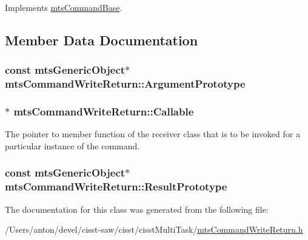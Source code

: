 Implements \hyperlink{classmts_command_base_a0885ce7a5321d7b672694ade780b9d64}{mts\+Command\+Base}.



\subsection{Member Data Documentation}
\hypertarget{classmts_command_write_return_a21b712fb9036e3dfad2d67c5f15932d2}{}
\subsubsection[{Argument\+Prototype}]{\setlength{\rightskip}{0pt plus 5cm}const {\bf mts\+Generic\+Object}$\ast$ mts\+Command\+Write\+Return\+::\+Argument\+Prototype\hspace{0.3cm}{\ttfamily [protected]}}\label{classmts_command_write_return_a21b712fb9036e3dfad2d67c5f15932d2}
\hypertarget{classmts_command_write_return_ada842b5e68290a2c53de66702025f4ab}{}
\subsubsection[{Callable}]{$\ast$ mts\+Command\+Write\+Return\+::\+Callable\hspace{0.3cm}{\ttfamily [protected]}}\label{classmts_command_write_return_ada842b5e68290a2c53de66702025f4ab}
The pointer to member function of the receiver class that is to be invoked for a particular instance of the command. \hypertarget{classmts_command_write_return_a02ec49cd66e7d95bd1ac9d08e5eb8cae}{}
\subsubsection[{Result\+Prototype}]{\setlength{\rightskip}{0pt plus 5cm}const {\bf mts\+Generic\+Object}$\ast$ mts\+Command\+Write\+Return\+::\+Result\+Prototype\hspace{0.3cm}{\ttfamily [protected]}}\label{classmts_command_write_return_a02ec49cd66e7d95bd1ac9d08e5eb8cae}


The documentation for this class was generated from the following file\+:\begin{DoxyCompactItemize}
\item 
/\+Users/anton/devel/cisst-\/saw/cisst/cisst\+Multi\+Task/\hyperlink{mts_command_write_return_8h}{mts\+Command\+Write\+Return.\+h}\end{DoxyCompactItemize}
